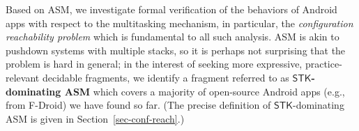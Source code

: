 \documentclass[preprint,12pt]{elsarticle}
\newcommand\standard{{\sf STD}}
\newcommand\singletop{{\sf STP}}
\newcommand\singletask{{\sf STK}}
\newcommand\singleinstance{{\sf SIT}}
\newcommand\ntkflag{{\sf NTK}}
\newcommand{\AMASS}{\textsf{ASM}}
\newcommand{\STK}{\mathsf{STK}}
\newcommand{\zhilin}[1]{\color{blue} {ZL: #1 :LZ} \color{black}}
\newcommand{\tl}[1]{\color{magenta} {TL: #1 :LT} \color{black}}
\newcommand{\zhilin}[1]{}
\newcommand{\tl}[1]{}
\begin{document}
%

Based on {\AMASS}, we %
investigate formal verification of the behaviors of Android apps  with respect to the multitasking mechanism, %
in particular, the \emph{configuration reachability problem} which is fundamental to all such analysis. 
%
{\AMASS} is akin to pushdown systems with multiple stacks, so it is perhaps not surprising that the problem is hard in general; 
in the interest of seeking more expressive, practice-relevant decidable fragments, 
we identify a fragment referred to as \textbf{$\STK$-dominating {\AMASS}} 
which 
covers a majority of open-source Android apps (e.g., from F-Droid) we have found so far. (The precise definition of $\STK$-dominating {\AMASS} is given in Section~\ref{sec-conf-reach}.) 
\end{document}
